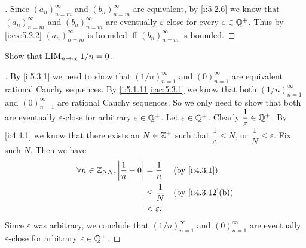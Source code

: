 \begin{proof}[]
  Since \((a_n)_{n = m}^{\infty}\) and \((b_n)_{n = m}^{\infty}\) are equivalent, by \cref{i:5.2.6} we know that \((a_n)_{n = m}^{\infty}\) and \((b_n)_{n = m}^{\infty}\) are eventually \(\varepsilon\)-close for every \(\varepsilon \in \mathbb{Q}^+\).
  Thus by \cref{i:ex:5.2.2} \((a_n)_{n = m}^{\infty}\) is bounded iff \((b_n)_{n = m}^{\infty}\) is bounded.
\end{proof}

\begin{ex}\label{i:ex:5.3.5}
  Show that \(\operatorname*{LIM}_{n \to \infty} 1 / n = 0\).
\end{ex}

\begin{proof}[]
  By \cref{i:5.3.1} we need to show that \((1 / n)_{n = 1}^\infty\) and \((0)_{n = 1}^\infty\) are equivalent rational Cauchy sequences.
  By \cref{i:5.1.11,i:ac:5.3.1} we know that both \((1/ n)_{n = 1}^{\infty}\) and \((0)_{n = 1}^\infty\) are rational Cauchy sequences.
  So we only need to show that both are eventually \(\varepsilon\)-close for arbitrary \(\varepsilon \in \mathbb{Q}^+\).
  Let \(\varepsilon \in \mathbb{Q}^+\).
  Clearly \(\dfrac{1}{\varepsilon} \in \mathbb{Q}^+\).
  By \cref{i:4.4.1} we know that there exists an \(N \in \mathbb{Z}^+\) such that \(\dfrac{1}{\varepsilon} \leq N\), or \(\dfrac{1}{N} \leq \varepsilon\).
  Fix such \(N\).
  Then we have
  \begin{align*}
    \forall n \in \Z_{\geq N}, \abs{\dfrac{1}{n} - 0} & = \dfrac{1}{n}    &  & \by{i:4.3.1}     \\
                                                      & \leq \dfrac{1}{N} &  & \by{i:4.3.12}[b] \\
                                                      & < \varepsilon.
  \end{align*}
  Since \(\varepsilon\) was arbitrary, we conclude that \((1 / n)_{n = 1}^\infty\) and \((0)_{n = 1}^\infty\) are eventually \(\varepsilon\)-close for arbitrary \(\varepsilon \in \mathbb{Q}^+\).
\end{proof}
